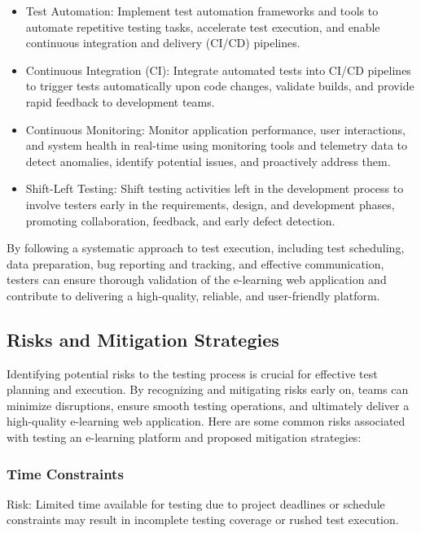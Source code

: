 		\begin{itemize}
			\item Test Automation: Implement test automation frameworks and tools to automate repetitive testing tasks, accelerate test execution, and enable continuous integration and delivery (CI/CD) pipelines.
			\item Continuous Integration (CI): Integrate automated tests into CI/CD pipelines to trigger tests automatically upon code changes, validate builds, and provide rapid feedback to development teams.
			\item Continuous Monitoring: Monitor application performance, user interactions, and system health in real-time using monitoring tools and telemetry data to detect anomalies, identify potential issues, and proactively address them.
			\item Shift-Left Testing: Shift testing activities left in the development process to involve testers early in the requirements, design, and development phases, promoting collaboration, feedback, and early defect detection.
		\end{itemize}
		
		By following a systematic approach to test execution, including test scheduling, data preparation, bug reporting and tracking, and effective communication, testers can ensure thorough validation of the e-learning web application and contribute to delivering a high-quality, reliable, and user-friendly platform.
		
	\subsection{Risks and Mitigation Strategies}
	
	Identifying potential risks to the testing process is crucial for effective test planning and execution. By recognizing and mitigating risks early on, teams can minimize disruptions, ensure smooth testing operations, and ultimately deliver a high-quality e-learning web application. Here are some common risks associated with testing an e-learning platform and proposed mitigation strategies:
	
		\subsubsection{Time Constraints}
		
		Risk: Limited time available for testing due to project deadlines or schedule constraints may result in incomplete testing coverage or rushed test execution.
		
